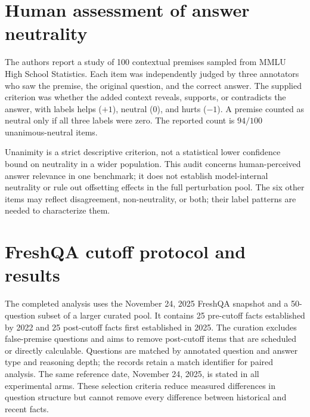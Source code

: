 \begin{revision}
\section{Human assessment of answer neutrality}
\label{app:human_neutrality}
The authors report a study of 100 contextual premises sampled from MMLU High School Statistics. Each item was independently judged by three annotators who saw the premise, the original question, and the correct answer. The supplied criterion was whether the added context reveals, supports, or contradicts the answer, with labels helps ($+1$), neutral ($0$), and hurts ($-1$). A premise counted as neutral only if all three labels were zero. The reported count is $94/100$ unanimous-neutral items.

Unanimity is a strict descriptive criterion, not a statistical lower confidence bound on neutrality in a wider population. This audit concerns human-perceived answer relevance in one benchmark; it does not establish model-internal neutrality or rule out offsetting effects in the full perturbation pool. The six other items may reflect disagreement, non-neutrality, or both; their label patterns are needed to characterize them.

\section{FreshQA cutoff protocol and results}
\label{app:freshqa}
The completed analysis uses the November 24, 2025 FreshQA snapshot and a 50-question subset of a larger curated pool. It contains 25 pre-cutoff facts established by 2022 and 25 post-cutoff facts first established in 2025. The curation excludes false-premise questions and aims to remove post-cutoff items that are scheduled or directly calculable. Questions are matched by annotated question and answer type and reasoning depth; the records retain a match identifier for paired analysis. The same reference date, November 24, 2025, is stated in all experimental arms. These selection criteria reduce measured differences in question structure but cannot remove every difference between historical and recent facts.


\end{revision}
